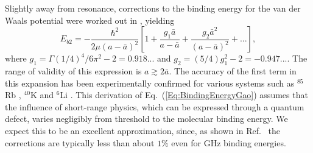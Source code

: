 
Slightly away from resonance, corrections to the binding energy for the van der Waals potential were worked out in \cite{gao01,gao04}, yielding
\begin{equation}\label{Eq:BindingEnergyGao}
	E_{b2}=-\frac{\hbar^2}{2\mu(a-\bar{a})^2}\left[1+\frac{g_1\bar{a}}{a-\bar{a}}+\frac{g_2\bar{a}^2}{(a-\bar{a})^2} + ... \right],
\end{equation}
where $g_1=\Gamma(1/4)^4/6\pi^2-2=0.918...$ and $g_2=(5/4)g_1^2-2=-0.947...$. The range of validity of this expression is $a \gtrsim 2 \bar{a}$. The accuracy of the first term in this expansion has been experimentally confirmed for various systems such as $^{85}$Rb \cite{ckt03,kgb03}, $^{40}$K \cite{rtb03,msg05} and $^{6}$Li \cite{bar05}. This derivation of Eq.\ (\ref{Eq:BindingEnergyGao}) assumes that the influence of short-range physics, which can be expressed through a quantum defect, varies negligibly from threshold to the molecular binding energy. We expect this to be an excellent approximation, since, as shown in Ref.~\cite{gao01} the corrections are typically less than about $1\%$ even for GHz binding energies.





